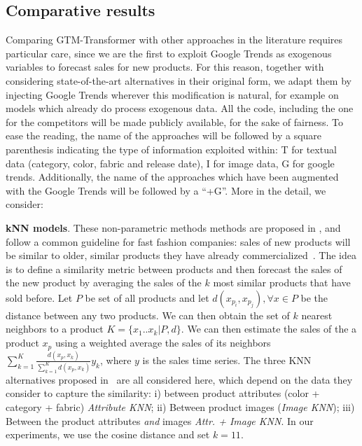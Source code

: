 \documentclass{article}
\newcommand{\approachname}[0] {GTM-Transformer\xspace}
\begin{document}
\subsection{Comparative results}\label{sec:exp:comp}

Comparing \approachname{} with other approaches in the literature requires particular care, since we are the first to exploit Google Trends as exogenous variables to forecast sales for new products. For this reason, together with considering state-of-the-art alternatives in their original form, we adapt them by injecting Google Trends wherever this modification is  natural, for example on models which already do process exogenous data. All the code, including the one for the competitors will be made publicly available, for the sake of fairness. To ease the reading, the name of the approaches will be followed by a square parenthesis indicating the type of information exploited within: T for textual data (category, color, fabric and release date), I for image data, G for google trends. Additionally, the name of the approaches which have been augmented with the Google Trends will be followed by a ``+G''. More in the detail, we consider: 

\textbf{kNN models}. These non-parametric methods methods are proposed in \cite{ekambaram_attention_2020}, and follow a common guideline for fast fashion companies: sales of new products will be similar to older, similar products they have already commercialized~\cite{thomassey2014sales}. The idea is to define a similarity metric between products and then forecast the sales of the new product by averaging the sales of the $k$ most similar products that have sold before. Let $P$ be set of all products and let $d(x_{p_i}, x_{p_j}), \forall x \in P$ be the distance between any two products. We can then obtain the set of $k$ nearest neighbors to a product $K = \{x_1 .. x_k | P, d\}$. We can then estimate the sales of the a product $x_p$ using a weighted average the sales of its neighbors $\sum_{k=1}^{K} \frac{d(x_p, x_k)}{\sum_{k=1}^{K}d(x_p, x_k)}y_k$, where $y$ is the sales time series. The three KNN alternatives proposed in~\cite{ekambaram_attention_2020} are all considered here, which depend on the data they consider to capture the similarity: i) between product attributes (color + category + fabric) \emph{Attribute KNN}; ii) Between product images (\emph{Image KNN}); iii) Between the product attributes \textit{and} images \emph{Attr. + Image KNN}. In our experiments, we use the cosine distance and set $k=11$.
\end{document}
